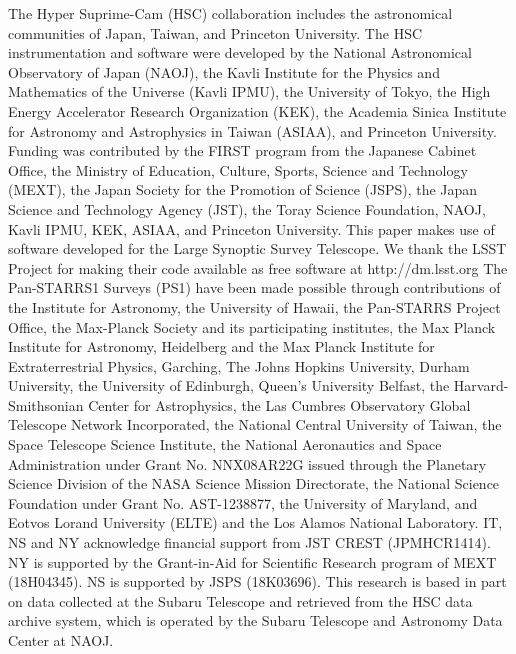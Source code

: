 \documentclass[useamsfonts]{pasj01}
\begin{document}
\begin{ack}
The Hyper Suprime-Cam (HSC) collaboration includes the astronomical communities of Japan, Taiwan, and Princeton University. The HSC instrumentation and software were developed by the National Astronomical Observatory of Japan (NAOJ), the Kavli Institute for the Physics and Mathematics of the Universe (Kavli IPMU), the University of Tokyo, the High Energy Accelerator Research Organization (KEK), the Academia Sinica Institute for Astronomy and Astrophysics in Taiwan (ASIAA), and Princeton University. Funding was contributed by the FIRST program from the Japanese Cabinet Office, the Ministry of Education, Culture, Sports, Science and Technology (MEXT), the Japan Society for the Promotion of Science (JSPS), the Japan Science and Technology Agency (JST), the Toray Science Foundation, NAOJ, Kavli IPMU, KEK, ASIAA, and Princeton University.
This paper makes use of software developed for the Large Synoptic Survey Telescope. We thank the LSST Project for making their code available as free software at  http://dm.lsst.org
The Pan-STARRS1 Surveys (PS1) have been made possible through contributions of the Institute for Astronomy, the University of Hawaii, the Pan-STARRS Project Office, the Max-Planck Society and its participating institutes, the Max Planck Institute for Astronomy, Heidelberg and the Max Planck Institute for Extraterrestrial Physics, Garching, The Johns Hopkins University, Durham University, the University of Edinburgh, Queen’s University Belfast, the Harvard-Smithsonian Center for Astrophysics, the Las Cumbres Observatory Global Telescope Network Incorporated, the National Central University of Taiwan, the Space Telescope Science Institute, the National Aeronautics and Space Administration under Grant No. NNX08AR22G issued through the Planetary Science Division of the NASA Science Mission Directorate, the National Science Foundation under Grant No. AST-1238877, the University of Maryland, and Eotvos Lorand University (ELTE) and the Los Alamos National Laboratory.
%
IT, NS and NY acknowledge financial support from JST CREST (JPMHCR1414). NY is supported by the Grant-in-Aid for Scientific Research program of MEXT (18H04345). NS is supported by JSPS (18K03696).
%
This research is based in part on data collected at the Subaru Telescope and retrieved from the HSC data archive system, which is operated by the Subaru Telescope and Astronomy Data Center at NAOJ.
\end{ack}
%
%
\appendix 
\end{document}
